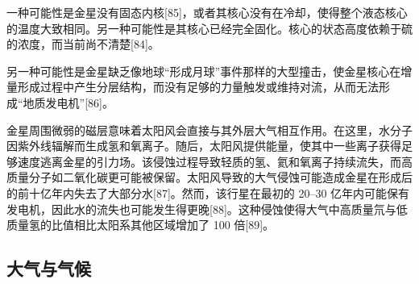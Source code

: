 一种可能性是金星没有固态内核[85]，或者其核心没有在冷却，使得整个液态核心的温度大致相同。另一种可能性是其核心已经完全固化。核心的状态高度依赖于硫的浓度，而当前尚不清楚[84]。

另一种可能性是金星缺乏像地球“形成月球”事件那样的大型撞击，使金星核心在增量形成过程中产生分层结构，而没有足够的力量触发或维持对流，从而无法形成“地质发电机”[86]。

金星周围微弱的磁层意味着太阳风会直接与其外层大气相互作用。在这里，水分子因紫外线辐解而生成氢和氧离子。随后，太阳风提供能量，使其中一些离子获得足够速度逃离金星的引力场。该侵蚀过程导致轻质的氢、氦和氧离子持续流失，而高质量分子如二氧化碳更可能被保留。太阳风导致的大气侵蚀可能造成金星在形成后的前十亿年内失去了大部分水[87]。然而，该行星在最初的 20–30 亿年内可能保有发电机，因此水的流失也可能发生得更晚[88]。这种侵蚀使得大气中高质量氘与低质量氢的比值相比太阳系其他区域增加了 100 倍[89]。
\subsection{大气与气候}




